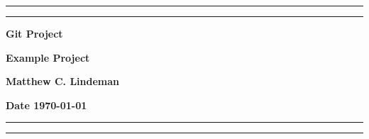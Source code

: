 \documentclass{report}
\begin{document}
\begin{titlepage}
    \begin{center}
        \vspace{0.25cm}
        \hrule
        \vspace{0.1cm}
        \hrule
        \vspace{0.25cm}
        {\LARGE{\textbf{Git Project}}}
        \par
        \vspace{0.25cm}
        {\large{\textbf{Example Project}}}
        \par
        \vspace{0.25cm}
        {\large{\textbf{Matthew C. Lindeman}}}
        \par
        \vspace{0.25cm}
        {\large{\textbf{Date \today}}}
        \vspace{0.25cm}
        \hrule
        \vspace{0.1cm}
        \hrule
        \vfill
    \end{center}
\end{titlepage}
\end{document}
